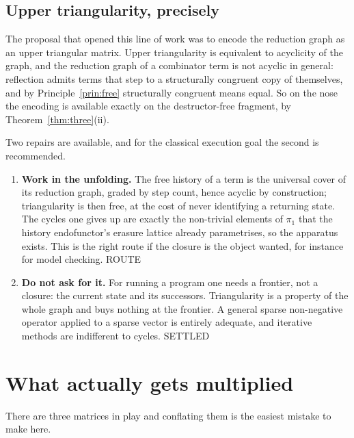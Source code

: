 \documentclass[11pt,a4paper]{article}
\theoremstyle{plain}
\theoremstyle{definition}
\theoremstyle{remark}
\begin{document}
\subsection{Upper triangularity, precisely}
\label{sec:triangular}

The proposal that opened this line of work was to encode the reduction graph
as an upper triangular matrix. Upper triangularity is equivalent to acyclicity
of the graph, and the reduction graph of a combinator term is not acyclic in
general: reflection admits terms that step to a structurally congruent copy of
themselves, and by Principle~\ref{prin:free} structurally congruent means
equal. So on the nose the encoding is available exactly on the
destructor-free fragment, by Theorem~\ref{thm:three}(ii).

Two repairs are available, and for the classical execution goal the second is
recommended.

\begin{enumerate}[label=(\arabic*),leftmargin=2.4em]
\item \textbf{Work in the unfolding.} The free history of a term is the
  universal cover of its reduction graph, graded by step count, hence acyclic
  by construction; triangularity is then free, at the cost of never
  identifying a returning state. The cycles one gives up are exactly the
  non-trivial elements of $\pi_1$ that the history endofunctor's erasure
  lattice already parametrises, so the apparatus exists. This is the right
  route if the closure is the object wanted, for instance for model checking.
  \textsf{ROUTE}
\item \textbf{Do not ask for it.} For running a program one needs a frontier,
  not a closure: the current state and its successors. Triangularity is a
  property of the whole graph and buys nothing at the frontier. A general
  sparse non-negative operator applied to a sparse vector is entirely
  adequate, and iterative methods are indifferent to cycles.
  \textsf{SETTLED}
\end{enumerate}

\section{What actually gets multiplied}
\label{sec:multiply}

There are three matrices in play and conflating them is the easiest mistake to
make here.
\end{document}

